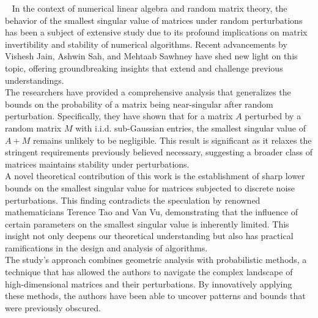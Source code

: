
~\cite{jain2020smoothed}
In the context of numerical linear algebra and random matrix theory, the behavior of the smallest singular value of matrices under random perturbations has been a subject of extensive study due to its profound implications on matrix invertibility and stability of numerical algorithms. Recent advancements by Vishesh Jain, Ashwin Sah, and Mehtaab Sawhney have shed new light on this topic, offering groundbreaking insights that extend and challenge previous understandings.\\\newline
The researchers have provided a comprehensive analysis that generalizes the bounds on the probability of a matrix being near-singular after random perturbation. Specifically, they have shown that for a matrix ${A}$ perturbed by a random matrix 
${M}$ with i.i.d. sub-Gaussian entries, the smallest singular value of ${A+M}$ remains unlikely to be negligible. This result is significant as it relaxes the stringent requirements previously believed necessary, suggesting a broader class of matrices maintains stability under perturbations.\\\newline
A novel theoretical contribution of this work is the establishment of sharp lower bounds on the smallest singular value for matrices subjected to discrete noise perturbations. This finding contradicts the speculation by renowned mathematicians Terence Tao and Van Vu, demonstrating that the influence of certain parameters on the smallest singular value is inherently limited. This insight not only deepens our theoretical understanding but also has practical ramifications in the design and analysis of algorithms.\\\newline
The study's approach combines geometric analysis with probabilistic methods, a technique that has allowed the authors to navigate the complex landscape of high-dimensional matrices and their perturbations. By innovatively applying these methods, the authors have been able to uncover patterns and bounds that were previously obscured.
